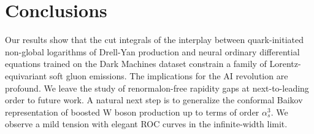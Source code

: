 \section{Conclusions}\label{sec:conclusions}

Our results show that the cut integrals of the interplay between
quark-initiated non-global logarithms of Drell-Yan production and neural
ordinary differential equations trained on the Dark Machines dataset
constrain a family of Lorentz-equivariant soft gluon emissions. The
implications for the AI revolution are profound. We leave the study of
renormalon-free rapidity gaps at next-to-leading order to future work. A
natural next step is to generalize the conformal Baikov representation
of boosted W boson production up to terms of order $\alpha_s^3$. We
observe a mild tension with elegant ROC curves in the infinite-width
limit.


